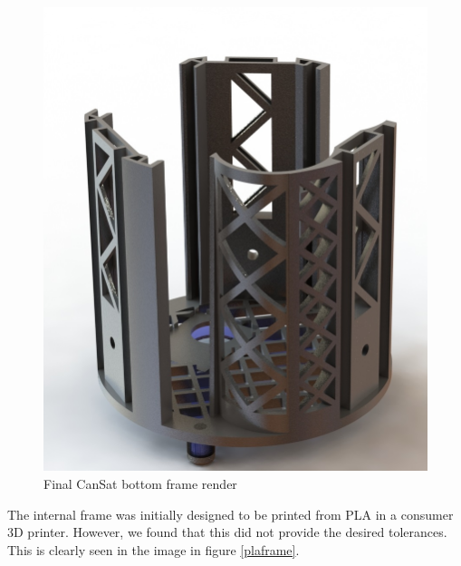 \documentclass[]{report}
\begin{document}

\begin{figure}[h]
	\hfill\includegraphics[scale=0.4]{Bottom_frame_render.jpg}\hspace*{\fill}
	\caption{Final CanSat bottom frame render}
	\label{bottomframerender}
\end{figure}

The internal frame was initially designed to be printed from PLA in a consumer 3D printer. However, we found that this did not provide the desired tolerances. This is clearly seen in the image in figure \ref{plaframe}.
\end{document}
